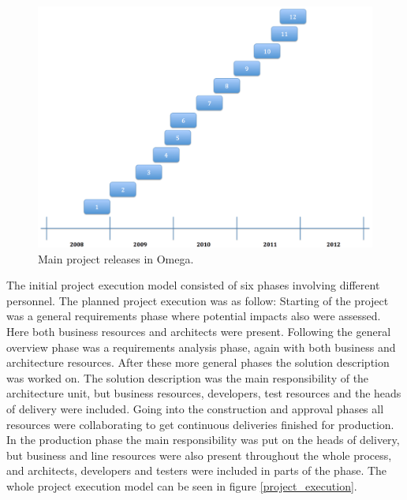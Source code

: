 \begin{figure}
\centering
\includegraphics[trim = 0mm 0mm 0mm 0mm,width=155mm]{images/project_releases}
\caption{Main project releases in Omega.}
\label{releases}
\end{figure}

The initial project execution model consisted of six phases involving different personnel. The planned project execution was as follow: Starting of the project was a general requirements phase where potential impacts also were assessed. Here both business resources and architects were present. Following the general overview phase was a requirements analysis phase, again with both business and architecture resources. After these more general phases the solution description was worked on. The solution description was the main responsibility of the architecture unit, but business resources, developers, test resources and the heads of delivery were included. Going into the construction and approval phases all resources were collaborating to get continuous deliveries finished for production. In the production phase the main responsibility was put on the heads of delivery, but business and line resources were also present throughout the whole process, and architects, developers and testers were included in parts of the phase. The whole project execution model can be seen in figure \ref{project_execution}.

